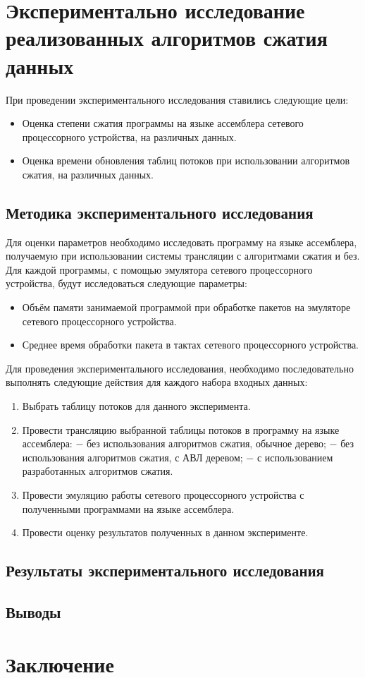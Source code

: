 \documentclass[a4paper, 12pt, titlepage, finall]{extreport}
\begin{document}
    \chapter{Экспериментально исследование реализованных алгоритмов сжатия данных}
        При проведении экспериментального исследования ставились следующие цели:
        \begin{itemize}
            \item Оценка степени сжатия программы на языке ассемблера сетевого процессорного устройства, на различных данных.
            \item Оценка времени обновления таблиц потоков при использовании алгоритмов сжатия, на различных данных.
        \end{itemize}
        \section{Методика экспериментального исследования}
            Для оценки параметров необходимо исследовать программу на языке ассемблера, получаемую при использовании
            системы трансляции с алгоритмами сжатия и без. Для каждой программы, с помощью эмулятора сетевого процессорного устройства,
            будут исследоваться следующие параметры:
            \begin{itemize}
                \item Объём памяти занимаемой программой при обработке пакетов на эмуляторе сетевого процессорного устройства.
                \item Среднее время обработки пакета в тактах сетевого процессорного устройства.
            \end{itemize}
            
            Для проведения экспериментального исследования, необходимо последовательно выполнять следующие действия для каждого набора входных данных:
            \begin{enumerate}
                \item Выбрать таблицу потоков для данного эксперимента.
                \item Провести трансляцию выбранной таблицы потоков в программу на языке ассемблера:
                    \subitem $-$ без использования алгоритмов сжатия, обычное дерево;
                    \subitem $-$ без использования алгоритмов сжатия, с АВЛ деревом;
                    \subitem $-$ с использованием разработанных алгоритмов сжатия.
                \item Провести эмуляцию работы сетевого процессорного устройства с полученными программами на языке ассемблера.
                \item Провести оценку результатов полученных в данном эксперименте.
            \end{enumerate}
        \section{Результаты экспериментального исследования}
        \section{Выводы}
    \chapter{Заключение}
\printbibliography{}
%
\end{document}
